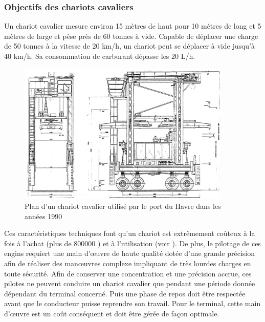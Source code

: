 \subsubsection{Objectifs des chariots cavaliers}

Un chariot cavalier mesure environ 15 mètres de haut pour 10 mètres de long et 5 mètres de large et pèse près de 60 tonnes à vide.
Capable de déplacer une charge de 50 tonnes à la vitesse de 20 km/h, un chariot peut se déplacer à vide jusqu'à 40 km/h.
Sa consommation de carburant dépasse les 20 L/h. 

\begin{figure}[ht]
  \begin{center}
   \includegraphics[width=0.9\textwidth]{chapitres/application/planSC.jpg}
   \caption{Plan d'un chariot cavalier utilisé par le port du Havre dans les années 1990}
   \label{fig:application:planSC}
  \end{center}
\end{figure}

Ces caractéristiques techniques font qu'un chariot est extrêmement coûteux à la fois à l'achat (plus de 800000 \geneuro) et à l'utilisation (voir \cite{Huang2003}).
De plus, le pilotage de ces engins requiert une main d'\oe uvre de haute qualité dotée d'une grande précision afin de réaliser des manœuvres complexe impliquant de très lourdes charges en toute sécurité.
Afin de conserver une concentration et une précision accrue, ces pilotes ne peuvent conduire un chariot cavalier que pendant une période donnée dépendant du terminal concerné. Puis une phase de repos doit être respectée avant que le conducteur puisse reprendre son travail. Pour le terminal, cette main d'\oe uvre est un coût conséquent et doit être gérée de façon optimale.

